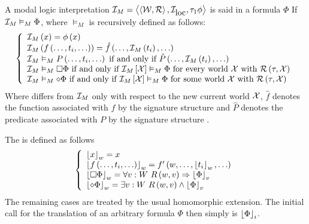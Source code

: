 \begin{defi}
A modal logic interpretation $\mathcal{I}_M=\left\langle \left\langle \mathcal{W},\mathcal{R}\right\rangle,\mathcal{I}_{\mbox{loc}},\tau_1\phi\right\rangle$ is said in  a formula $\Phi$ If $\mathcal{I}_M\vDash_M\Phi$, where $\vDash_M$ is recursively defined as follows:
\begin{equation}
\left\{\begin{array}{l}
\mathcal{I}_M\left(x\right)=\phi\left(x\right)\\
\mathcal{I}_M\left(f\left(\ldots,t_i,\ldots\right)\right)=\hat{f}\left(\ldots,\mathcal{I}_M\left(t_i\right),\ldots\right)\\
\mathcal{I}_M\vDash_MP\left(\ldots,t_i,\ldots\right)\mbox{ if and only if{} }\hat{P}\left(\ldots,\mathcal{I}_M\left(t_i\right),\ldots\right)\\
\mathcal{I}_M\vDash_M\square\Phi\mbox{ if and only if{} }\mathcal{I}_M\left[ \mathcal{X}\right]\vDash_M\Phi\mbox{ for every{} world } \mathcal{X}\mbox{ with }\mathcal{R}\left(\tau,\mathcal{X}\right)\\
\mathcal{I}_M\vDash_M\diamond\Phi\mbox{ if and only if{} }\mathcal{I}_M\left[ \mathcal{X}\right]\vDash_M\Phi\mbox{ for some{} world } \mathcal{X}\mbox{ with }\mathcal{R}\left(\tau,\mathcal{X}\right)
\end{array}\right.
\end{equation}
Where  differs from $\mathcal{I}_M$ only with respect to the new current world $\mathcal{X}$, $\hat{f}$ denotes the function associated with $f$ by the signature structure  and $\hat{P}$ denotes the predicate associated with $P$ by the signature structure .
\cite{conf/ijcai/Nonnengart93}
\end{defi}

\begin{defi}
The  is defined as follows
\begin{equation}
\group{
\floor{x}_w=x\\
\floor{\fun{f}{\ldots,t_i,\ldots}}_w=\fun{f'}{w,\ldots,\floor{t_i}_w,\ldots}\\
\floor{\square\Phi}_w=\forall v:W\ \fun{R}{w,v}\Rightarrow\floor{\Phi}_v\\
\floor{\diamond\Phi}_w=\exists v:W\ \fun{R}{w,v}\wedge\floor{\Phi}_v\\
}
\end{equation}
The remaining cases are treated by the usual homomorphic extension. The initial call for the translation of an arbitrary formula $\Phi$ then simply  is $\left\lfloor \Phi\right\rfloor_i$.
\cite{conf/ijcai/Nonnengart93}
\end{defi}

